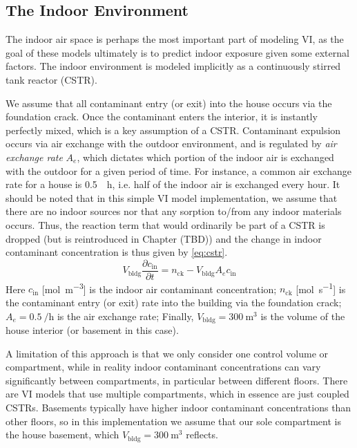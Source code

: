 
\subsection{The Indoor Environment}\label{sec:indoor}

The indoor air space is perhaps the most important part of modeling VI, as the goal of these models ultimately is to predict indoor exposure given some external factors.
The indoor environment is modeled implicitly as a continuously stirred tank reactor (CSTR).\par
We assume that all contaminant entry (or exit) into the house occurs via the foundation crack.
Once the contaminant enters the interior, it is instantly perfectly mixed, which is a key assumption of a CSTR.
Contaminant expulsion occurs via air exchange with the outdoor environment, and is regulated by \textit{air exchange rate} $A_e$, which dictates which portion of the indoor air is exchanged with the outdoor for a given period of time.
For instance, a common air exchange rate for a house is \SI{0.5}{\per\hour}, i.e. half of the indoor air is exchanged every hour.
It should be noted that in this simple VI model implementation, we assume that there are no indoor sources nor that any sorption to/from any indoor materials occurs.
Thus, the reaction term that would ordinarily be part of a CSTR is dropped (but is reintroduced in Chapter (TBD)) and the change in indoor contaminant concentration is thus given by \eqref{eq:cstr}. %
\begin{equation}\label{eq:cstr}
  V_\mathrm{bldg}\frac{\partial c_\mathrm{in}}{\partial t} = n_\mathrm{ck} - V_\mathrm{bldg} A_e c_\mathrm{in}
\end{equation}
Here $c_\mathrm{in}$ [\si{\mol\per\metre\cubed}] is the indoor air contaminant concentration;
$n_\mathrm{ck}$ [\si{\mol\per\second}] is the contaminant entry (or exit) rate into the building via the foundation crack;
$A_e = \SI{0.5}{\per\hour}$ is the air exchange rate;
Finally, $V_\mathrm{bldg} = \SI{300}{\metre\cubed}$ is the volume of the house interior (or basement in this case).\par

A limitation of this approach is that we only consider one control volume or compartment, while in reality indoor contaminant concentrations can vary significantly between compartments, in particular between different floors.
There are VI models that use multiple compartments, which in essence are just coupled CSTRs\cite{murphy_multi-compartment_2011}.
Basements typically have higher indoor contaminant concentrations than other floors, so in this implementation we assume that our sole compartment is the house basement, which $V_\mathrm{bldg} = \SI{300}{\metre\cubed}$ reflects.\par

